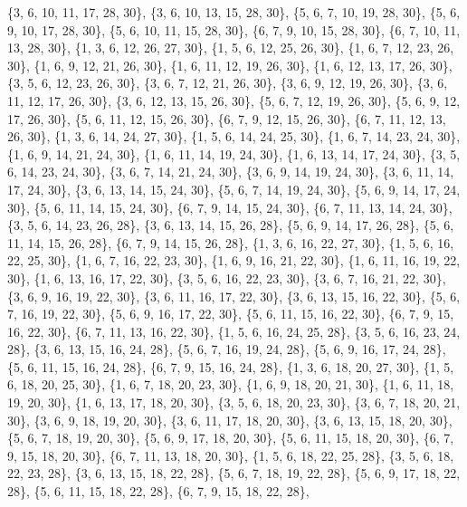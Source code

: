 \documentclass[11pt,a4paper]{article}
\begin{document}
{\{3, 6, 10, 11, 17, 28, 30\}, \{3, 6, 10, 13, 15, 28, 30\}, \{5, 6, 7, 10, 19, 28, 30\}, \{5, 6, 9, 10, 17, 28, 30\}, \{5, 6, 10, 11, 15, 28, 30\},
\{6, 7, 9, 10, 15, 28, 30\}, \{6, 7, 10, 11, 13, 28, 30\}, \{1, 3, 6, 12, 26, 27, 30\}, \{1, 5, 6, 12, 25, 26, 30\}, \{1, 6, 7, 12, 23, 26, 30\},
\{1, 6, 9, 12, 21, 26, 30\}, \{1, 6, 11, 12, 19, 26, 30\}, \{1, 6, 12, 13, 17, 26, 30\}, \{3, 5, 6, 12, 23, 26, 30\}, \{3, 6, 7, 12, 21, 26, 30\},
\{3, 6, 9, 12, 19, 26, 30\}, \{3, 6, 11, 12, 17, 26, 30\}, \{3, 6, 12, 13, 15, 26, 30\}, \{5, 6, 7, 12, 19, 26, 30\}, \{5, 6, 9, 12, 17, 26, 30\},
\{5, 6, 11, 12, 15, 26, 30\}, \{6, 7, 9, 12, 15, 26, 30\}, \{6, 7, 11, 12, 13, 26, 30\}, \{1, 3, 6, 14, 24, 27, 30\}, \{1, 5, 6, 14, 24, 25, 30\},
\{1, 6, 7, 14, 23, 24, 30\}, \{1, 6, 9, 14, 21, 24, 30\}, \{1, 6, 11, 14, 19, 24, 30\}, \{1, 6, 13, 14, 17, 24, 30\}, \{3, 5, 6, 14, 23, 24, 30\},
\{3, 6, 7, 14, 21, 24, 30\}, \{3, 6, 9, 14, 19, 24, 30\}, \{3, 6, 11, 14, 17, 24, 30\}, \{3, 6, 13, 14, 15, 24, 30\}, \{5, 6, 7, 14, 19, 24, 30\},
\{5, 6, 9, 14, 17, 24, 30\}, \{5, 6, 11, 14, 15, 24, 30\}, \{6, 7, 9, 14, 15, 24, 30\}, \{6, 7, 11, 13, 14, 24, 30\}, \{3, 5, 6, 14, 23, 26, 28\},
\{3, 6, 13, 14, 15, 26, 28\}, \{5, 6, 9, 14, 17, 26, 28\}, \{5, 6, 11, 14, 15, 26, 28\}, \{6, 7, 9, 14, 15, 26, 28\}, \{1, 3, 6, 16, 22, 27, 30\},
\{1, 5, 6, 16, 22, 25, 30\}, \{1, 6, 7, 16, 22, 23, 30\}, \{1, 6, 9, 16, 21, 22, 30\}, \{1, 6, 11, 16, 19, 22, 30\}, \{1, 6, 13, 16, 17, 22, 30\},
\{3, 5, 6, 16, 22, 23, 30\}, \{3, 6, 7, 16, 21, 22, 30\}, \{3, 6, 9, 16, 19, 22, 30\}, \{3, 6, 11, 16, 17, 22, 30\}, \{3, 6, 13, 15, 16, 22, 30\},
\{5, 6, 7, 16, 19, 22, 30\}, \{5, 6, 9, 16, 17, 22, 30\}, \{5, 6, 11, 15, 16, 22, 30\}, \{6, 7, 9, 15, 16, 22, 30\}, \{6, 7, 11, 13, 16, 22, 30\},
\{1, 5, 6, 16, 24, 25, 28\}, \{3, 5, 6, 16, 23, 24, 28\}, \{3, 6, 13, 15, 16, 24, 28\}, \{5, 6, 7, 16, 19, 24, 28\}, \{5, 6, 9, 16, 17, 24, 28\},
\{5, 6, 11, 15, 16, 24, 28\}, \{6, 7, 9, 15, 16, 24, 28\}, \{1, 3, 6, 18, 20, 27, 30\}, \{1, 5, 6, 18, 20, 25, 30\}, \{1, 6, 7, 18, 20, 23, 30\},
\{1, 6, 9, 18, 20, 21, 30\}, \{1, 6, 11, 18, 19, 20, 30\}, \{1, 6, 13, 17, 18, 20, 30\}, \{3, 5, 6, 18, 20, 23, 30\}, \{3, 6, 7, 18, 20, 21, 30\},
\{3, 6, 9, 18, 19, 20, 30\}, \{3, 6, 11, 17, 18, 20, 30\}, \{3, 6, 13, 15, 18, 20, 30\}, \{5, 6, 7, 18, 19, 20, 30\}, \{5, 6, 9, 17, 18, 20, 30\},
\{5, 6, 11, 15, 18, 20, 30\}, \{6, 7, 9, 15, 18, 20, 30\}, \{6, 7, 11, 13, 18, 20, 30\}, \{1, 5, 6, 18, 22, 25, 28\}, \{3, 5, 6, 18, 22, 23, 28\},
\{3, 6, 13, 15, 18, 22, 28\}, \{5, 6, 7, 18, 19, 22, 28\}, \{5, 6, 9, 17, 18, 22, 28\}, \{5, 6, 11, 15, 18, 22, 28\}, \{6, 7, 9, 15, 18, 22, 28\},
}
\end{document}
